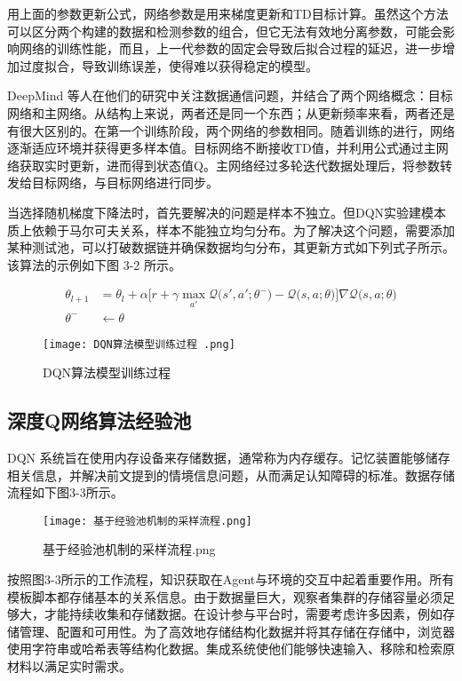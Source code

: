 用上面的参数更新公式，网络参数是用来梯度更新和TD目标计算。虽然这个方法可以区分两个构建的数据和检测参数的组合，但它无法有效地分离参数，可能会影响网络的训练性能，而且，上一代参数的固定会导致后拟合过程的延迟，进一步增加过度拟合，导致训练误差，使得难以获得稳定的模型。

DeepMind 等人在他们的研究中关注数据通信问题，并结合了两个网络概念：目标网络和主网络。从结构上来说，两者还是同一个东西；从更新频率来看，两者还是有很大区别的。在第一个训练阶段，两个网络的参数相同。随着训练的进行，网络逐渐适应环境并获得更多样本值。目标网络不断接收TD值，并利用公式通过主网络获取实时更新，进而得到状态值Q。主网络经过多轮迭代数据处理后，将参数转发给目标网络，与目标网络进行同步。

当选择随机梯度下降法时，首先要解决的问题是样本不独立。但DQN实验建模本质上依赖于马尔可夫关系，样本不能独立均匀分布。为了解决这个问题，需要添加某种测试池，可以打破数据链并确保数据均匀分布，其更新方式如下列式子所示。该算法的示例如下图 3-2 所示。

\begin{align}
	\theta_{l+1} &= \theta_l + \alpha \bigg[ r + \gamma \max_{a'} \mathcal{Q}\Big(s', a'; \theta^- \Big) - \mathcal{Q}\big(s, a; \theta\big) \bigg] \nabla \mathcal{Q}\big(s, a; \theta\big) \\
	\theta^- &\leftarrow \theta
\end{align}

\begin{figure}[hbt]
	\centering
	\texttt{[image: DQN算法模型训练过程 .png]}
	\caption{DQN算法模型训练过程}
	\label{f.example}
\end{figure}

\subsection{深度Q网络算法经验池}

DQN 系统旨在使用内存设备来存储数据，通常称为内存缓存\cite{wawrzynski2013autonomous}。记忆装置能够储存相关信息，并解决前文提到的情境信息问题，从而满足认知障碍的标准。数据存储流程如下图3-3所示。

\begin{figure}[hbt]
	\centering
	\texttt{[image: 基于经验池机制的采样流程.png]}
	\caption{基于经验池机制的采样流程.png}
	\label{f.example}
\end{figure}

按照图3-3所示的工作流程，知识获取在Agent与环境的交互中起着重要作用。所有模板脚本都存储基本的关系信息。由于数据量巨大，观察者集群的存储容量必须足够大，才能持续收集和存储数据。在设计参与平台时，需要考虑许多因素，例如存储管理、配置和可用性。为了高效地存储结构化数据并将其存储在存储中，浏览器使用字符串或哈希表等结构化数据。集成系统使他们能够快速输入、移除和检索原材料以满足实时需求。


